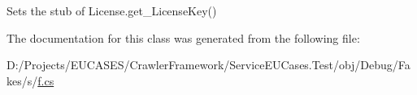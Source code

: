 Sets the stub of License.\-get\-\_\-\-License\-Key()



The documentation for this class was generated from the following file\-:\begin{DoxyCompactItemize}
\item 
D\-:/\-Projects/\-E\-U\-C\-A\-S\-E\-S/\-Crawler\-Framework/\-Service\-E\-U\-Cases.\-Test/obj/\-Debug/\-Fakes/s/\hyperlink{s_2f_8cs}{f.\-cs}\end{DoxyCompactItemize}
